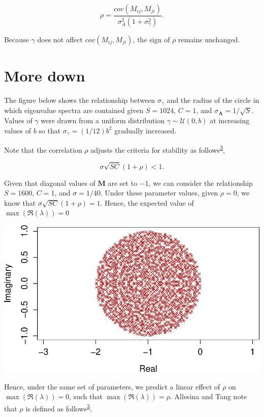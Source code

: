 \documentclass[]{article}
\begin{document}
\[\rho = \frac{cov(M_{ij}, M_{ji})}{\sigma^{2}_{A}(1 + \sigma^{2}_{\gamma})}.\]

Because \(\gamma\) does not affect \(cov(M_{ij}, M_{ji})\), the sign of
\(\rho\) remains unchanged.

\section{More down}\label{more-down}

The figure below shows the relationship between \(\sigma_{\gamma}\) and
the radius of the circle in which eigenvalue spectra are contained given
\(S = 1024\), \(C = 1\), and \(\sigma_{\textbf{A}} = 1/\sqrt{S}\).
Values of \(\gamma\) were drawn from a uniform distribution
\(\gamma \sim \mathcal{U}(0, b)\) at increasing values of \(b\) so that
\(\sigma_{\gamma} = (1/12)b^2\) gradually increased.

Note that the correlation \(\rho\) adjusts the criteria for stability as
follows\textsuperscript{\protect\hyperlink{ref-Allesina2015a}{3}},

\[\sigma\sqrt{SC}\left(1 + \rho\right) < 1.\]

Given that diagonal values of \(\textbf{M}\) are set to \(-1\), we can
consider the relationship \(S = 1600\), \(C = 1\), and
\(\sigma = 1/40\). Under these parameter values, given \(\rho = 0\), we
know that \(\sigma\sqrt{SC}\left(1 + \rho\right) = 1\). Hence, the
expected value of \(\max(\Re(\lambda)) = 0\)

\includegraphics{revision_notes_files/figure-latex/unnamed-chunk-3-1.pdf}

Hence, under the same set of parameters, we predict a linear effect of
\(\rho\) on \(\max(\Re(\lambda)) = 0\), such that
\(\max(\Re(\lambda)) = \rho\). Allesina and Tang note that \(\rho\) is
defined as
follows\textsuperscript{\protect\hyperlink{ref-Allesina2015a}{3}},
\end{document}

